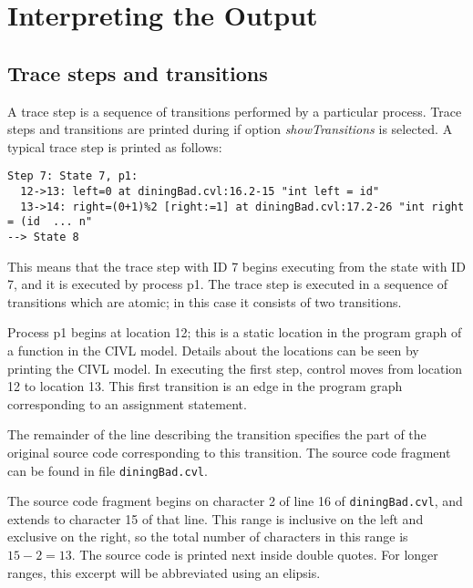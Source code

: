 \chapter{Interpreting the Output}

\section{Trace steps and transitions}

A trace step is a sequence of transitions performed by a particular process. 
Trace steps and transitions are printed during if option
\emph{showTransitions} is selected.  A typical trace step is printed
as follows:

\begin{verbatim}
Step 7: State 7, p1:
  12->13: left=0 at diningBad.cvl:16.2-15 "int left = id"
  13->14: right=(0+1)%2 [right:=1] at diningBad.cvl:17.2-26 "int right = (id  ... n"
--> State 8
\end{verbatim}

This means that the trace step with ID 7 begins executing from the state with
ID 7, and it is executed by process p1.  The trace step
is executed in a sequence of transitions which are atomic; 
in this case it consists of two transitions.

Process p1 begins at location 12; this is a static location in the
program graph of a function in the CIVL model.  Details about the
locations can be seen by printing the CIVL model.  In executing the
first step, control moves from location 12 to location 13.  This first
transition is an edge in the program graph corresponding to an assignment
statement.

The remainder of the line describing the transition specifies the part of
the original source code corresponding to this transition.  The source code
fragment can be found in file \texttt{diningBad.cvl}.  

The source code fragment begins on character 2 of line 16 of
\texttt{diningBad.cvl}, and extends to character 15 of that line.  This range is
inclusive on the left and exclusive on the right, so the total number
of characters in this range is $15-2=13$.  The source code is 
printed next inside double quotes.  For longer
ranges, this excerpt will be abbreviated using an elipsis.

